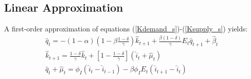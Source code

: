 \documentclass[11pt,fleqn]{article}
\begin{document}
\subsection{Linear Approximation}

A first-order approximation of equations (\ref{Kdemand_s})-(\ref{Ksupply_s}) yields:
\begin{gather}
\hat{q}_t = - (1-\alpha)(1-\beta \frac{1-\delta}{\gamma}) \hat{k}_{t+1} + \frac{\beta (1-\delta)}{\gamma} E_t \hat{q}_{t+1} + \hat{\beta}_{t}\label{Klin_demand} \\
\hat{k}_{t+1} = \frac{1-\delta}{\gamma} \hat{k}_t + \left[ 1-\frac{1-\delta}{\gamma} \right]  \left( \hat{i}_t + \hat{\mu}_t \right) \label{Klin_accumulation}  \\
\hat{q}_t + \hat{\mu}_t = \phi_I \left( \hat{i}_t - \hat{i}_{t-1} \right) - \beta \phi_I  E_t \left( \hat{i}_{t+1} - \hat{i}_{t} \right)  \label{Klin_supply}
\end{gather}
\end{document}

